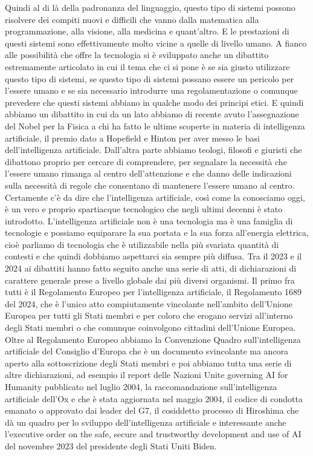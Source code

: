 Quindi al di là della padronanza del linguaggio, questo tipo di sistemi possono risolvere dei compiti nuovi e difficili che vanno dalla matematica alla programmazione, alla visione, alla medicina e quant'altro.
E le prestazioni di questi sistemi sono effettivamente molto vicine a quelle di livello umano.
A fianco alle possibilità che offre la tecnologia si è sviluppato anche un dibattito estremamente articolato in cui il tema che ci si pone è se sia giusto utilizzare questo tipo di sistemi, se questo tipo di sistemi possano essere un pericolo per l'essere umano e se sia necessario introdurre una regolamentazione o comunque prevedere che questi sistemi abbiano in qualche modo dei principi etici.
E quindi abbiamo un dibattito in cui da un lato abbiamo di recente avuto l'assegnazione del Nobel per la Fisica a chi ha fatto le ultime scoperte in materia di intelligenza artificiale, il premio dato a Hopefield e Hinton per aver messo le basi dell'intelligenza artificiale.
Dall'altra parte abbiamo teologi, filosofi e giuristi che dibattono proprio per cercare di comprendere, per segnalare la necessità che l'essere umano rimanga al centro dell'attenzione e che danno delle indicazioni sulla necessità di regole che consentano di mantenere l'essere umano al centro.
Certamente c'è da dire che l'intelligenza artificiale, così come la conosciamo oggi, è un vero e proprio spartiacque tecnologico che negli ultimi decenni è stato introdotto.
L'intelligenza artificiale non è una tecnologia ma è una famiglia di tecnologie e possiamo equiparare la sua portata e la sua forza all'energia elettrica, cioè parliamo di tecnologia che è utilizzabile nella più svariata quantità di contesti e che quindi dobbiamo aspettarci sia sempre più diffusa.
Tra il 2023 e il 2024 ai dibattiti hanno fatto seguito anche una serie di atti, di dichiarazioni di carattere generale prese a livello globale dai più diversi organismi.
Il primo fra tutti è il Regolamento Europeo per l'intelligenza artificiale, il Regolamento 1689 del 2024, che è l'unico atto compiutamente vincolante nell'ambito dell'Unione Europea per tutti gli Stati membri e per coloro che erogano servizi all'interno degli Stati membri o che comunque coinvolgono cittadini dell'Unione Europea.
Oltre al Regolamento Europeo abbiamo la Convenzione Quadro sull'intelligenza artificiale del Consiglio d'Europa che è un documento svincolante ma ancora aperto alla sottoscrizione degli Stati membri e poi abbiamo tutta una serie di altre dichiarazioni, ad esempio il report delle Nazioni Unite governing AI for Humanity pubblicato nel luglio 2004, la raccomandazione sull'intelligenza artificiale dell'Ox e che è stata aggiornata nel maggio 2004, il codice di condotta emanato o approvato dai leader del G7, il cosiddetto processo di Hiroshima che dà un quadro per lo sviluppo dell'intelligenza artificiale e interessante anche l'executive order on the safe, secure and trustworthy development and use of AI del novembre 2023 del presidente degli Stati Uniti Biden.
